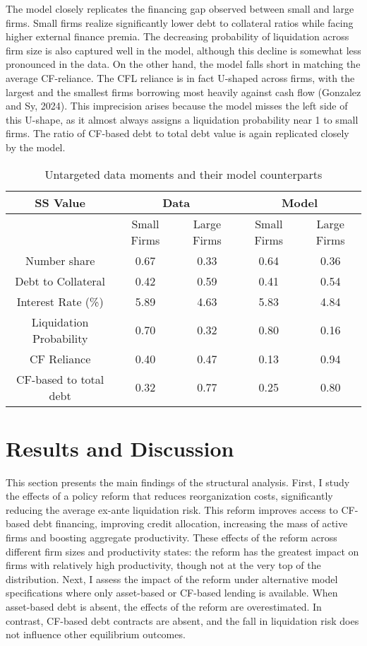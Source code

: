 \documentclass[12pt]{article}
\begin{document}
\noindent The model closely replicates the financing gap observed between small and large firms. Small firms realize significantly lower debt to collateral ratios while facing higher external finance premia. The decreasing probability of liquidation across firm size is also captured well in the model, although this decline is somewhat less pronounced in the data. On the other hand, the model falls short in matching the average CF-reliance. The CFL reliance is in fact U-shaped across firms, with the largest and the smallest firms borrowing most heavily against cash flow (Gonzalez and Sy, 2024). This imprecision arises because the model misses the left side of this U-shape, as it almost always assigns a liquidation probability near 1 to small firms. The ratio of CF-based debt to total debt value is again replicated closely by the model. 

\begin{table}[h!]
    \centering
    \begin{tabular}{c|c|c||c|c}
    \textbf{SS Value} &  \multicolumn{2}{c}{\textbf{Data}} & \multicolumn{2}{c}{\textbf{Model}} \\ 
    \toprule
     & Small Firms & Large Firms & Small Firms & Large Firms  \\ 
    \midrule
    Number share & 0.67 & 0.33 & 0.64 & 0.36 \\ 
    Debt to Collateral & 0.42 & 0.59 & 0.41 & 0.54 \\ 
    Interest Rate (\%) & 5.89 & 4.63 & 5.83 & 4.84 \\ 
    Liquidation Probability & 0.70 & 0.32 & 0.80 & 0.16 \\ 
    CF Reliance & 0.40 & 0.47 & 0.13 & 0.94 \\ 
    CF-based to total debt & 0.32 & 0.77 & 0.25 & 0.80 \\ 
    \bottomrule
    \end{tabular}
    \caption{Untargeted data moments and their model counterparts}
    \label{tab:untargeted}
\end{table}


\section{Results and Discussion \label{sec:results}}

This section presents the main findings of the structural analysis. First, I study the effects of a policy reform that reduces reorganization costs, significantly reducing the average ex-ante liquidation risk. This reform improves access to CF-based debt financing, improving credit allocation, increasing the mass of active firms and boosting aggregate productivity. These effects of the reform across different firm sizes and productivity states: the reform has the greatest impact on firms with relatively high productivity, though not at the very top of the distribution. Next, I assess the impact of the reform under alternative model specifications where only asset-based or CF-based lending is available. When asset-based debt is absent, the effects of the reform are overestimated. In contrast, CF-based debt contracts are absent, and the fall in liquidation risk does not influence other equilibrium outcomes.
\end{document}

